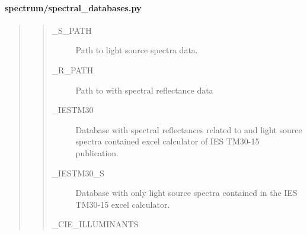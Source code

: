 \documentclass[letterpaper,10pt,english]{sphinxmanual}
\begin{document}
\begin{quote}
\begin{quote}
\begin{description}
\begin{description}
\end{description}

\end{description}\end{quote}
\end{quote}


\paragraph{spectrum/spectral\_databases.py}
\label{\detokenize{spectrum:spectrum-spectral-databases-py}}\begin{quote}
\begin{quote}\begin{description}
\item[{\_S\_PATH}] \leavevmode
Path to light source spectra data.

\item[{\_R\_PATH}] \leavevmode
Path to with spectral reflectance data

\item[{\_IESTM30}] \leavevmode
Database with spectral reflectances related to and light source 
spectra contained excel calculator of IES TM30-15 publication.

\item[{\_IESTM30\_S}] \leavevmode
Database with only light source spectra contained in the 
IES TM30-15 excel calculator.

\item[{\_CIE\_ILLUMINANTS}] \leavevmode
{}


\end{description}
\end{quote}
\end{quote}
\end{document}
